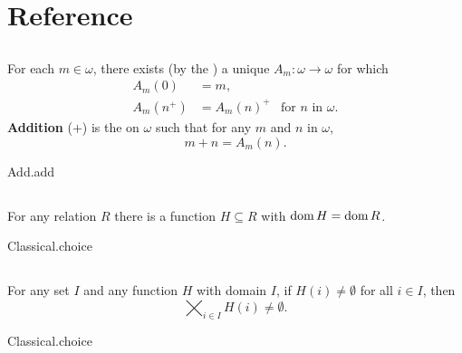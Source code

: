 \documentclass{report}
\begin{document}

\tableofcontents

\begingroup
\renewcommand\thechapter{R}
\setcounter{chapter}{0}
\addtocounter{chapter}{-1}

\chapter{Reference}%

\section{}%

  For each $m \in \omega$, there exists (by the
    ) a unique
     $A_m \colon \omega \rightarrow \omega$ for which
    \begin{align*}
      A_m(0) & = m, \\
      A_m(n^+) & = A_m(n)^+ & \text{for } n \text{ in } \omega.
    \end{align*}
  \textbf{Addition} ($+$) is the  on $\omega$ such
    that for any $m$ and $n$ in $\omega$, $$m + n = A_m(n).$$

    {Add.add}

\section{}%

  For any relation $R$ there is a function $H \subseteq R$ with
    $\mathop{\text{dom}}{H} = \mathop{\text{dom}}{R}$.

    {Classical.choice}

\section{}%

  For any set $I$ and any function $H$ with domain $I$, if $H(i) \neq \emptyset$
    for all $i \in I$, then $$\bigtimes_{i \in I} H(i) \neq \emptyset.$$

    {Classical.choice}

\section{}%
\end{document}

